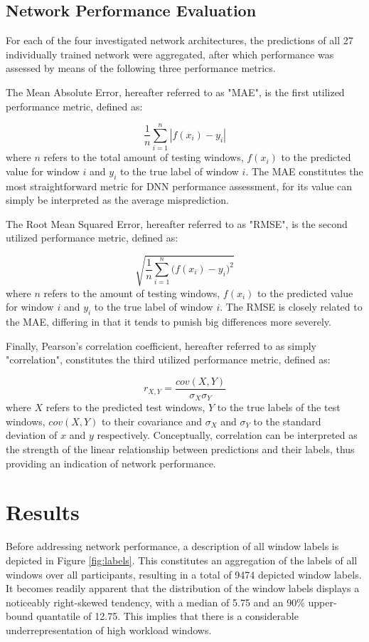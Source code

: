 \documentclass[fleqn,11pt]{paper}
\begin{document}
\subsection{Network Performance Evaluation}
For each of the four investigated network architectures, the predictions of all 27 individually trained network were aggregated, after which performance was assessed by means of the following three performance metrics. 

The Mean Absolute Error, hereafter referred to as "MAE",  is the first utilized performance metric, defined as:

$$\frac{1}{n} \sum^n_{i=1}|f(x_i)-y_i|$$
where $n$ refers to the total amount of testing windows, $f(x_i)$ to the predicted value for window $i$ and $y_i$ to the true label of window $i$.
The MAE constitutes the most straightforward metric for DNN performance assessment, for its value can simply be interpreted as the average misprediction. 

The Root Mean Squared Error, hereafter referred to as "RMSE", is the second utilized performance metric, defined as:

$$\sqrt{{\frac{1}{n} \sum^n_{i=1} \Big( f(x_i)-y_i} \Big) ^2}$$
where $n$ refers to the amount of testing windows, $f(x_i)$ to the predicted value for window $i$ and $y_i$ to the true label of window $i$. The RMSE is closely related to the MAE, differing in that it tends to punish big differences more severely. 

Finally, Pearson's correlation coefficient, hereafter referred to as simply "correlation", constitutes the third utilized performance metric, defined as:

$$r_{X,Y} = \frac{cov(X,Y)}{\sigma_{X} \sigma_{Y}}$$
where $X$ refers to the predicted test windows,  $Y$ to the true labels of the test windows, $cov(X,Y)$ to their covariance and $\sigma_{X}$ and $\sigma_{Y}$ to the standard deviation of $x$ and $y$ respectively.  Conceptually, correlation can be interpreted as the strength of the linear relationship between predictions and their labels, thus providing an indication of network performance. 

\vspace{8mm}
\section{Results}
Before addressing network performance, a description of all window labels is depicted in Figure \ref{fig:labels}. This constitutes an aggregation of the labels of all windows over all participants, resulting in a total of 9474 depicted window labels. It becomes readily apparent that the distribution of the window labels displays a noticeably right-skewed tendency, with a median of 5.75 and an 90\% upper-bound quantatile of 12.75. This implies that there is a considerable underrepresentation of high workload windows.
\end{document}
